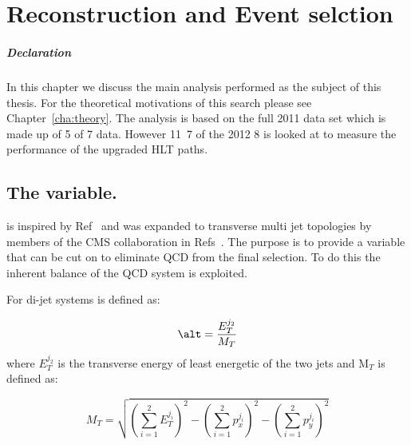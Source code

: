 \chapter{Reconstruction and Event selction} %
\label{cha:the_t_analysis}
\paragraph{Declaration} %
\label{par:declaration-alphat}


In this chapter we discuss the main analysis performed as the subject of this 
thesis. For the theoretical motivations of this search please see 
Chapter~\ref{cha:theory}. The analysis is based on the full 2011 data set which
is made up of \unit{5}{\invfb} of \unit{7}{\TeV} data. However 
\unit{11.7}{\invfb} of the 2012 \unit{8}{\TeV} is looked at to measure the 
performance of the upgraded \alt HLT paths.




\section{The \alt variable.} %
\label{sec:the_alpha___t_variable_}
\alt is inspired by Ref~\cite{Randall:2008dk} and was expanded to transverse 
multi jet topologies by members of the CMS collaboration in 
Refs~\cite{cms-pas-sus-08005,cms-pas-sus-09001}. The purpose is to provide a 
variable that can be cut on to eliminate QCD from the final selection. To do 
this the inherent balance of the QCD system is exploited.

For di-jet systems \alt is defined as:

\begin{equation}
  \alt = \frac{E_{T}^{j_{2}}}{M_{T}}
\end{equation}
where $E_{T}^{j_{2}}$ is the transverse energy of least energetic of the two jets 
and M$_{T}$ is defined as:

\begin{equation}
  M_{T} = \sqrt{\left(\sum^{2}_{i=1}E_{T}^{j_{i}}\right)^{2} - \left(\sum^{2}_{i=1}p_{x}^{j_{i}}\right)^{2} - \left(\sum^{2}_{i=1}p_{y}^{j_{i}}\right)^{2}}
\end{equation}

